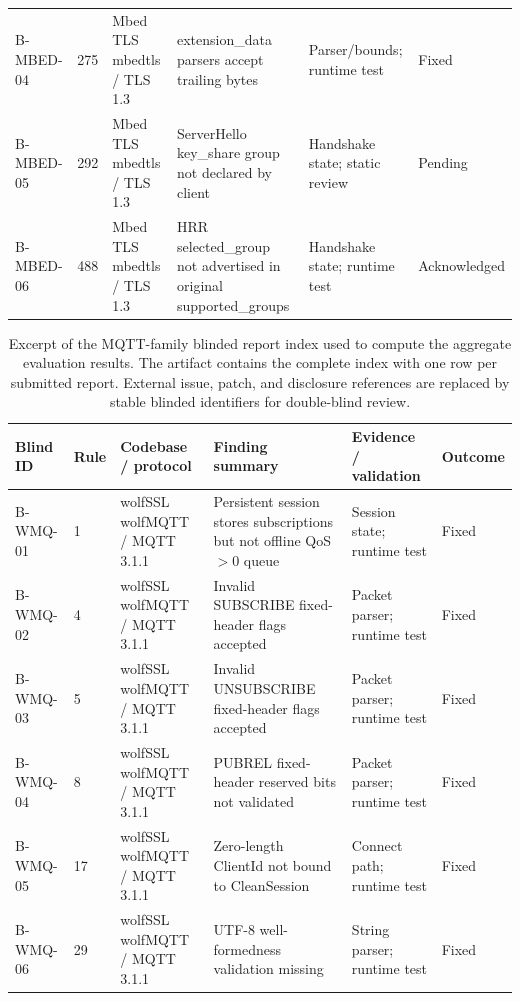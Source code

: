 \begin{table}[p]
\begin{tabular}{p{}p{}p{}p{}p{}p{}}
B-MBED-04 & 275 & Mbed TLS mbedtls / TLS 1.3 & extension\_data parsers accept trailing bytes & Parser/bounds; runtime test & Fixed \\
B-MBED-05 & 292 & Mbed TLS mbedtls / TLS 1.3 & ServerHello key\_share group not declared by client & Handshake state; static review & Pending \\
B-MBED-06 & 488 & Mbed TLS mbedtls / TLS 1.3 & HRR selected\_group not advertised in original supported\_groups & Handshake state; runtime test & Acknowledged \\
\bottomrule
\end{tabular}
\end{table}

\begin{table}[p]
\centering
\caption{Excerpt of the MQTT-family blinded report index used to compute the
aggregate evaluation results. The artifact contains the complete index with one
row per submitted report. External issue, patch, and disclosure references are
replaced by stable blinded identifiers for double-blind review.}
\label{tab:sample-report-index-mqtt}
\footnotesize
\renewcommand{\arraystretch}{1.05}
\setlength{\tabcolsep}{2.0pt}
\begin{tabular}{p{}p{}p{}p{}p{}p{}}
\toprule
\textbf{Blind ID} & \textbf{Rule} & \textbf{Codebase / protocol} & \textbf{Finding summary} & \textbf{Evidence / validation} & \textbf{Outcome} \\
\midrule
B-WMQ-01 & 1 & wolfSSL wolfMQTT / MQTT 3.1.1 & Persistent session stores subscriptions but not offline QoS$>$0 queue & Session state; runtime test & Fixed \\
B-WMQ-02 & 4 & wolfSSL wolfMQTT / MQTT 3.1.1 & Invalid SUBSCRIBE fixed-header flags accepted & Packet parser; runtime test & Fixed \\
B-WMQ-03 & 5 & wolfSSL wolfMQTT / MQTT 3.1.1 & Invalid UNSUBSCRIBE fixed-header flags accepted & Packet parser; runtime test & Fixed \\
B-WMQ-04 & 8 & wolfSSL wolfMQTT / MQTT 3.1.1 & PUBREL fixed-header reserved bits not validated & Packet parser; runtime test & Fixed \\
B-WMQ-05 & 17 & wolfSSL wolfMQTT / MQTT 3.1.1 & Zero-length ClientId not bound to CleanSession & Connect path; runtime test & Fixed \\
B-WMQ-06 & 29 & wolfSSL wolfMQTT / MQTT 3.1.1 & UTF-8 well-formedness validation missing & String parser; runtime test & Fixed \\

\end{tabular}
\end{table}
